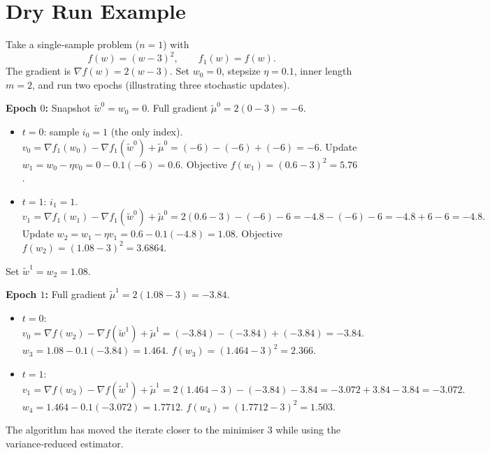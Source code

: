 \documentclass{article}
\begin{document}
\section*{Dry Run Example}
Take a single‑sample problem ($n=1$) with  
\[
f(w)=(w-3)^{2},\qquad f_{1}(w)=f(w).
\]
The gradient is $\nabla f(w)=2(w-3)$.  
Set $w_{0}=0$, stepsize $\eta=0.1$, inner length $m=2$, and run two epochs (illustrating three stochastic updates).

\medskip
\noindent\textbf{Epoch $0$:} Snapshot $\tilde{w}^{0}=w_{0}=0$.  
Full gradient $\tilde{\mu}^{0}=2(0-3)=-6$.

\begin{itemize}
\item $t=0$: sample $i_{0}=1$ (the only index).  
  $v_{0}= \nabla f_{1}(w_{0})-\nabla f_{1}(\tilde{w}^{0})+\tilde{\mu}^{0}
       =(-6)-(-6)+(-6)=-6.$  
  Update $w_{1}=w_{0}-\eta v_{0}=0-0.1(-6)=0.6.$  
  Objective $f(w_{1})=(0.6-3)^{2}=5.76$.
\item $t=1$: $i_{1}=1$.  
  $v_{1}= \nabla f_{1}(w_{1})-\nabla f_{1}(\tilde{w}^{0})+\tilde{\mu}^{0}
       =2(0.6-3)-(-6)-6 = -4.8-(-6)-6 = -4.8+6-6 = -4.8.$  
  Update $w_{2}=w_{1}-\eta v_{1}=0.6-0.1(-4.8)=1.08.$  
  Objective $f(w_{2})=(1.08-3)^{2}=3.6864$.
\end{itemize}
Set $\tilde{w}^{1}=w_{2}=1.08$.

\medskip
\noindent\textbf{Epoch $1$:} Full gradient $\tilde{\mu}^{1}=2(1.08-3)=-3.84$.

\begin{itemize}
\item $t=0$: $v_{0}= \nabla f(w_{2})-\nabla f(\tilde{w}^{1})+\tilde{\mu}^{1}
       =(-3.84)-(-3.84)+(-3.84)=-3.84.$  
  $w_{3}=1.08-0.1(-3.84)=1.464.$  
  $f(w_{3})=(1.464-3)^{2}=2.366.$
\item $t=1$: $v_{1}= \nabla f(w_{3})-\nabla f(\tilde{w}^{1})+\tilde{\mu}^{1}
       =2(1.464-3)-(-3.84)-3.84 = -3.072+3.84-3.84 = -3.072.$  
  $w_{4}=1.464-0.1(-3.072)=1.7712.$  
  $f(w_{4})=(1.7712-3)^{2}=1.503.$
\end{itemize}
The algorithm has moved the iterate closer to the minimiser $3$ while using the variance‑reduced estimator.
\end{document}
